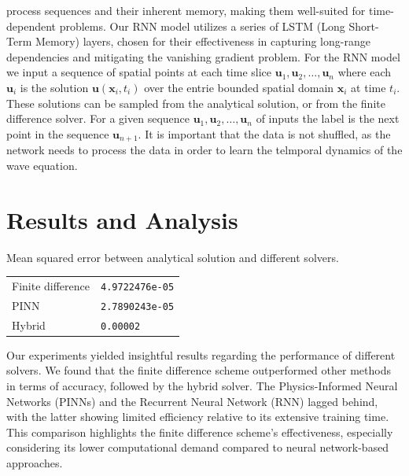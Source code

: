 \documentclass[twoside,11pt]{report}
\begin{document}
    process sequences and their inherent memory, making them well-suited for time-dependent problems.
    Our RNN model utilizes a series of LSTM (Long Short-Term Memory)\cite{lstm} layers, chosen for their 
    effectiveness in capturing long-range dependencies and mitigating the vanishing gradient problem.
    For the RNN model we input a sequence of spatial points at each time slice 
    $\mathbf{u}_1, \mathbf{u}_2, \dots, \mathbf{u}_n$ where each $\mathbf{u}_i$ is 
    the solution $\mathbf{u}(\mathbf{x}_i,t_i)$
    over the entrie bounded spatial domain $\mathbf{x}_i$ at time $t_i$. These solutions can be sampled from the analytical
    solution, or from the finite difference solver.
    For a given sequence $\mathbf{u}_1, \mathbf{u}_2, \dots, \mathbf{u}_n$ of inputs the 
    label is the next point in the sequence
    $\mathbf{u}_{n+1}$.
    It is important that the data is not shuffled, as the network needs to process the data in order to learn the
    telmporal dynamics of the wave equation.
        \cite{hu2022neuralpde}



\section{Results and Analysis}
\label{sec:resultsdiscussion}

    \begin{mytable}[float=!h,label=tab:toyscores, width=0.5\textwidth]{Mean squared error between 
        analytical solution and different solvers.}
    \centering
    \begin{tabular}{l|l}
        Finite difference   &\texttt{4.9722476e-05}  \\
        PINN                &\texttt{2.7890243e-05}  \\
        Hybrid              &\texttt{0.00002}  \\
    \end{tabular}%
    \end{mytable}
    
    Our experiments yielded insightful results regarding the performance of different solvers. 
    We found that the finite difference scheme outperformed other methods in terms of accuracy, 
    followed by the hybrid solver. The Physics-Informed Neural Networks (PINNs) and the Recurrent Neural Network (RNN) 
    lagged behind, with the latter showing limited efficiency relative to its extensive training time. 
    This comparison highlights the finite difference scheme's effectiveness, especially considering its 
    lower computational demand compared to neural network-based approaches.
\end{document}
